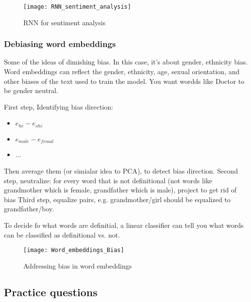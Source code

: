 \begin{figure}[H]
\centering
\texttt{[image: RNN\_sentiment\_analysis]}
\caption{RNN for sentiment analysis}
\end{figure}

\subsubsection{Debiasing word embeddings}
Some of the ideas of dimishing bias. In this case, it's about gender, ethnicity bias. Word embeddings can reflect the gender, ethnicity, age, sexual orientation, and other biases of the text used to train the model. You want wordds like Doctor to be gender neutral.

First step, Identifying bias direction:
\begin{itemize}
    \item $e_{he} - e_{she}$
    \item $e_{male} - e_{femal}$
    \item ...
\end{itemize}
Then average them (or simialar idea to PCA), to detect bias direction.
Second step, neutralize: for every word that is not definitional (not words like grandmother which is female, grandfather which is male), project to get rid of bias
Third step, equalize pairs, e.g. grandmother/girl should be equalized to grandfather/boy.

To decide fo what words are definitial, a linear classifier can tell you what words can be classified as definitional vs. not.

\begin{figure}[H]
\centering
\texttt{[image: Word\_embeddings\_Bias]}
\caption{Addressing bias in word embeddings}
\end{figure}

\subsection{Practice questions}
